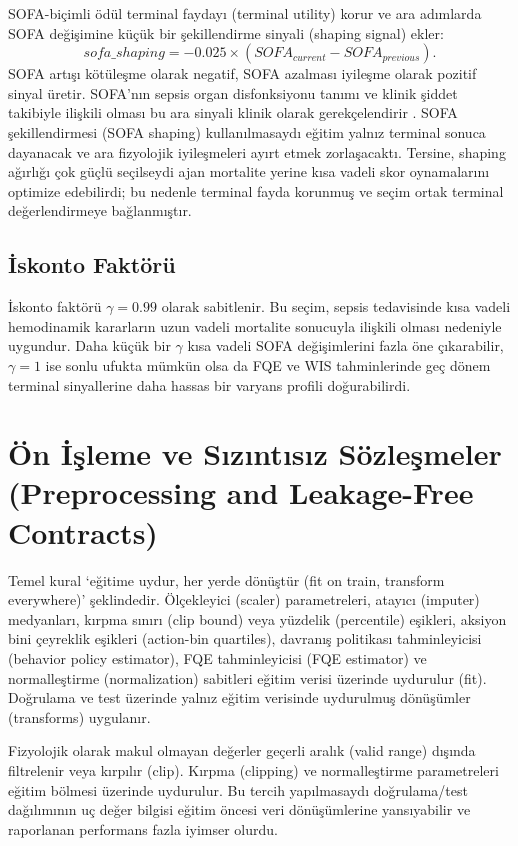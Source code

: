 \documentclass[conference]{IEEEtran}
\begin{document}
SOFA-biçimli ödül terminal faydayı (terminal utility) korur ve ara adımlarda SOFA değişimine küçük bir şekillendirme sinyali (shaping signal) ekler:
\begin{equation}
sofa\_shaping = -0.025 \times (SOFA_{current}-SOFA_{previous}).
\end{equation}
SOFA artışı kötüleşme olarak negatif, SOFA azalması iyileşme olarak pozitif sinyal üretir. SOFA'nın sepsis organ disfonksiyonu tanımı ve klinik şiddet takibiyle ilişkili olması bu ara sinyali klinik olarak gerekçelendirir \cite{singer2016sepsis3}. SOFA şekillendirmesi (SOFA shaping) kullanılmasaydı eğitim yalnız terminal sonuca dayanacak ve ara fizyolojik iyileşmeleri ayırt etmek zorlaşacaktı. Tersine, shaping ağırlığı çok güçlü seçilseydi ajan mortalite yerine kısa vadeli skor oynamalarını optimize edebilirdi; bu nedenle terminal fayda korunmuş ve seçim ortak terminal değerlendirmeye bağlanmıştır.

\subsection{İskonto Faktörü}
İskonto faktörü $\gamma=0.99$ olarak sabitlenir. Bu seçim, sepsis tedavisinde kısa vadeli hemodinamik kararların uzun vadeli mortalite sonucuyla ilişkili olması nedeniyle uygundur. Daha küçük bir $\gamma$ kısa vadeli SOFA değişimlerini fazla öne çıkarabilir, $\gamma=1$ ise sonlu ufukta mümkün olsa da FQE ve WIS tahminlerinde geç dönem terminal sinyallerine daha hassas bir varyans profili doğurabilirdi.

\section{Ön İşleme ve Sızıntısız Sözleşmeler (Preprocessing and Leakage-Free Contracts)}
Temel kural `eğitime uydur, her yerde dönüştür (fit on train, transform everywhere)' şeklindedir. Ölçekleyici (scaler) parametreleri, atayıcı (imputer) medyanları, kırpma sınırı (clip bound) veya yüzdelik (percentile) eşikleri, aksiyon bini çeyreklik eşikleri (action-bin quartiles), davranış politikası tahminleyicisi (behavior policy estimator), FQE tahminleyicisi (FQE estimator) ve normalleştirme (normalization) sabitleri eğitim verisi üzerinde uydurulur (fit). Doğrulama ve test üzerinde yalnız eğitim verisinde uydurulmuş dönüşümler (transforms) uygulanır.

Fizyolojik olarak makul olmayan değerler geçerli aralık (valid range) dışında filtrelenir veya kırpılır (clip). Kırpma (clipping) ve normalleştirme parametreleri eğitim bölmesi üzerinde uydurulur. Bu tercih yapılmasaydı doğrulama/test dağılımının uç değer bilgisi eğitim öncesi veri dönüşümlerine yansıyabilir ve raporlanan performans fazla iyimser olurdu.
\end{document}
